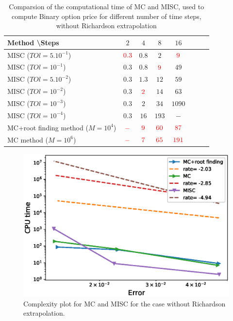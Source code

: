 \documentclass[11pt]{article}
\begin{document}
\begin{table}[h!]
	\centering
	\begin{tabular}{l*{6}{c}r}
		Method \textbackslash  Steps            & $2$ & $4$ & $8$ & $16$ &   \\
		\hline
		MISC ($TOl=5.10^{-1}$)  & ${\color{red}0.3}$ & $0.8$ & $2$ & ${\color{red}9}$  \\
		MISC ($TOl=10^{-1}$)   & $0.3$ & $0.8$ & ${\color{red}9}$ & $49$  \\
		MISC ($TOl=5.10^{-2}$)   & $0.3$ & $1.3$ & $12$ & $59$  \\
		MISC ($TOl=10^{-2}$)   & $0.3$ & ${\color{red}2}$ & $14$ & $63$  \\
		MISC ($TOl=10^{-3}$)   & $0.3$ & $2$ & $34$ & $1090$  \\
    	MISC ($TOl=10^{-4}$)   & $0.3$ & $16$ & $193$ & $-$  \\
		\hline
		MC+root finding method ($M=10^4$)    & ${\color{red}-}$ & ${\color{red}9}$ & ${\color{red}60}$ & ${\color{red}87}$  \\
		MC method ($M=10^6$)    & ${\color{red}-}$ & ${\color{red}7}$ & ${\color{red}65}$ & ${\color{red}191}$  \\
		\hline
	\end{tabular}
	\caption{Comparsion of the computational time of  MC and MISC, used to compute Binary option price  for different number of time steps, without Richardson extrapolation}
	\label{Comparsion of the computational time of  MC and MISC, used to compute Binary option price  for different number of time steps, without Richardson extrapolation}
\end{table}





	\begin{figure}[h!]
	\centering
	\includegraphics[width=0.7\linewidth]{./figures/Binary_Complexity_rates/error_vs_time}
	
	\caption{Complexity plot for MC and MISC for the case without Richardson extrapolation.}
	\label{fig:Complexity plot for MC and MISC , Binary, Non rich}
\end{figure}
\end{document}
